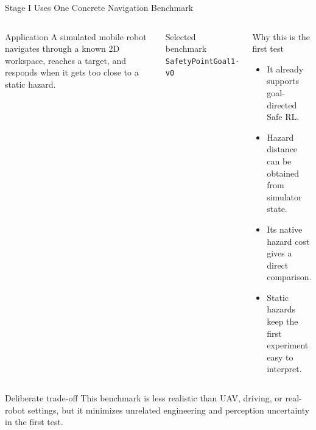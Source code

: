 \documentclass[aspectratio=169]{beamer}
\begin{document}
\begin{frame}{Stage I Uses One Concrete Navigation Benchmark}
\begin{columns}[T]
\begin{block}{Application}
\footnotesize
A simulated mobile robot navigates through a known 2D workspace, reaches a target, and responds when it gets too close to a static hazard.
\end{block}

\begin{block}{Selected benchmark}
\large
\texttt{SafetyPointGoal1-v0}
\end{block}

\begin{block}{Why this is the first test}
\footnotesize
\begin{itemize}
  \item It already supports goal-directed Safe RL.
  \item Hazard distance can be obtained from simulator state.
  \item Its native hazard cost gives a direct comparison.
  \item Static hazards keep the first experiment easy to interpret.
\end{itemize}
\end{block}
\end{columns}

\begin{block}{Deliberate trade-off}
\footnotesize
This benchmark is less realistic than UAV, driving, or real-robot settings, but it minimizes unrelated engineering and perception uncertainty in the first test.
\end{block}
\end{frame}
\end{document}
